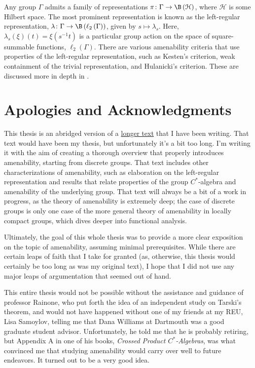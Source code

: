 \documentclass[10pt]{mypackage2}
\begin{document}
Any group $\Gamma$ admits a family of representations $\pi\colon \Gamma\rightarrow \B\left( \mathcal{H} \right)$, where $\mathcal{H}$ is some Hilbert space. The most prominent representation is known as the left-regular representation, $\lambda\colon \Gamma\rightarrow \B\left( \ell_2\left( \Gamma \right) \right)$, given by $s\mapsto \lambda_s$. Here, $\lambda_s\left( \xi \right)\left( t \right) = \xi\left( s^{-1}t \right)$ is a particular group action on the space of square-summable functions, $\ell_2\left( \Gamma \right)$. There are various amenability criteria that use properties of the left-regular representation, such as Kesten's criterion, weak containment of the trivial representation, and Hulanicki's criterion. These are discussed more in depth in \cite[Appendix A]{juschenko_amenability}.
\section{Apologies and Acknowledgments}%
This thesis is an abridged version of a \href{https://blog.avinashiyer.xyz/Classes_and_Homework/College/Y4/Honors%20Thesis/Amenability%20Text/amenability.pdf}{longer text} that I have been writing. That text would have been my thesis, but unfortunately it's a bit too long. I'm writing it with the aim of creating a thorough overview that properly introduces amenability, starting from discrete groups. That text includes other characterizations of amenability, such as elaboration on the left-regular representation and results that relate properties of the group $C^{\ast}$-algebra and amenability of the underlying group. That text will always be a bit of a work in progress, as the theory of amenability is extremely deep; the case of discrete groups is only one case of the more general theory of amenability in locally compact groups, which dives deeper into functional analysis.\newline

Ultimately, the goal of this whole thesis was to provide a more clear exposition on the topic of amenability, assuming minimal prerequisites. While there are certain leaps of faith that I take for granted (as, otherwise, this thesis would certainly be too long as was my original text), I hope that I did not use any major leaps of argumentation that seemed out of hand.\newline

This entire thesis would not be possible without the assistance and guidance of professor Rainone, who put forth the idea of an independent study on Tarski's theorem, and would not have happened without one of my friends at my REU, Lisa Samoylov, telling me that Dana Williams at Dartmouth was a good graduate student advisor. Unfortunately, he told me that he is probably retiring, but Appendix A in one of his books, \textit{Crossed Product $C^{\ast}$-Algebras}, was what convinced me that studying amenability would carry over well to future endeavors. It turned out to be a very good idea.
\nocite{*}
\printbibliography[title={References}]
\end{document}
